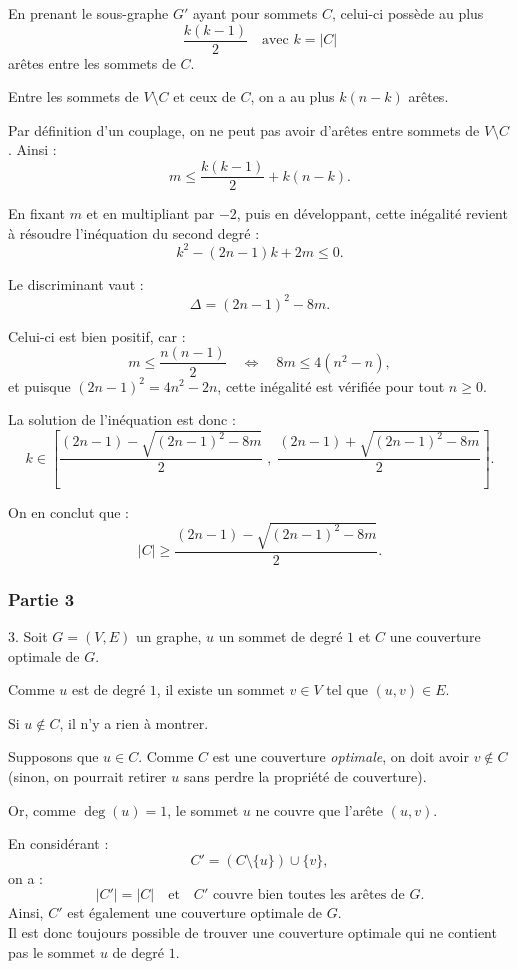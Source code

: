 \documentclass{article}
\begin{document}
En prenant le sous-graphe $G'$ ayant pour sommets $C$, celui-ci possède au plus 
\[
\dfrac{k(k-1)}{2} \quad \text{avec } k = |C|
\]
arêtes entre les sommets de $C$.

Entre les sommets de $V \setminus C$ et ceux de $C$, on a au plus $k(n-k)$ arêtes.

Par définition d’un couplage, on ne peut pas avoir d’arêtes entre sommets de $V \setminus C$.  
Ainsi :
\[
m \leq \dfrac{k(k-1)}{2} + k(n-k).
\]

En fixant $m$ et en multipliant par $-2$, puis en développant, cette inégalité revient à résoudre l’inéquation du second degré :
\[
k^2 - (2n - 1)k + 2m \leq 0.
\]

Le discriminant vaut :
\[
\Delta = (2n - 1)^2 - 8m.
\]

Celui-ci est bien positif, car :
\[
m \leq \dfrac{n(n-1)}{2} \quad \Longleftrightarrow \quad 8m \leq 4(n^2 - n),
\]
et puisque $(2n - 1)^2 = 4n^2 - 2n$, cette inégalité est vérifiée pour tout $n \geq 0$.

\medskip

La solution de l’inéquation est donc :
\[
k \in 
\left[
\dfrac{(2n - 1) - \sqrt{(2n - 1)^2 - 8m}}{2} \; , \;
\dfrac{(2n - 1) + \sqrt{(2n - 1)^2 - 8m}}{2}
\right].
\]

\medskip

On en conclut que :
\[
|C| \geq \dfrac{(2n - 1) - \sqrt{(2n - 1)^2 - 8m}}{2}.
\]




\subsubsection*{Partie 3}

3. Soit $G = (V,E)$ un graphe, $u$ un sommet de degré $1$ et $C$ une couverture optimale de $G$.

Comme $u$ est de degré $1$, il existe un sommet $v \in V$ tel que $(u,v) \in E$.

\medskip

Si $u \notin C$, il n'y a rien à montrer.

\medskip

Supposons que $u \in C$.  
Comme $C$ est une couverture \emph{optimale}, on doit avoir $v \notin C$ (sinon, on pourrait retirer $u$ sans perdre la propriété de couverture).

Or, comme $\deg(u) = 1$, le sommet $u$ ne couvre que l’arête $(u,v)$.

En considérant :
\[
C' = (C \setminus \{u\}) \cup \{v\},
\]
on a :
\[
|C'| = |C| \quad \text{et} \quad C' \text{ couvre bien toutes les arêtes de } G.
\]
Ainsi, $C'$ est également une couverture optimale de $G$.\\
Il est donc toujours possible de trouver une couverture optimale qui ne contient pas le sommet $u$ de degré $1$.
\end{document}
